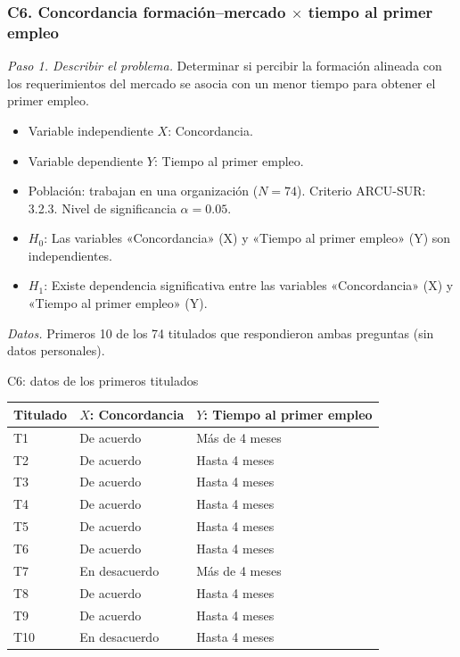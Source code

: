 \subsubsection*{C6. Concordancia formación–mercado $\times$ tiempo al primer empleo}

\textit{Paso 1. Describir el problema.} Determinar si percibir la formación alineada con los requerimientos del mercado se asocia con un menor tiempo para obtener el primer empleo.

\begin{itemize}[nosep]
  \item Variable independiente $X$: Concordancia.
  \item Variable dependiente $Y$: Tiempo al primer empleo.
  \item Población: trabajan en una organización ($N = 74$). Criterio ARCU-SUR: 3.2.3. Nivel de significancia $\alpha = 0.05$.
  \item $H_0$: Las variables «Concordancia» (X) y «Tiempo al primer empleo» (Y) son independientes.
  \item $H_1$: Existe dependencia significativa entre las variables «Concordancia» (X) y «Tiempo al primer empleo» (Y).
\end{itemize}

\textit{Datos.} Primeros 10 de los 74 titulados que respondieron ambas preguntas (sin datos personales).

\begin{mitabla}{C6: datos de los primeros titulados}
\begin{tabular}{lll}
\toprule
Titulado & $X$: Concordancia & $Y$: Tiempo al primer empleo \\
\midrule
T1 & De acuerdo & Más de 4 meses \\
T2 & De acuerdo & Hasta 4 meses \\
T3 & De acuerdo & Hasta 4 meses \\
T4 & De acuerdo & Hasta 4 meses \\
T5 & De acuerdo & Hasta 4 meses \\
T6 & De acuerdo & Hasta 4 meses \\
T7 & En desacuerdo & Más de 4 meses \\
T8 & De acuerdo & Hasta 4 meses \\
T9 & De acuerdo & Hasta 4 meses \\
T10 & En desacuerdo & Hasta 4 meses \\
\bottomrule
\end{tabular}
\end{mitabla}

